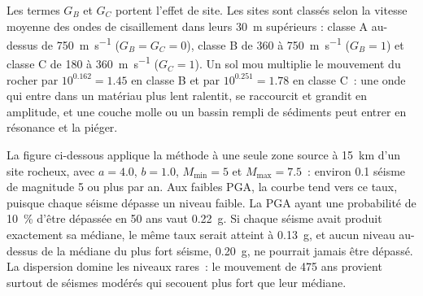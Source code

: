 Les termes $G_B$ et $G_C$ portent l'effet de site. Les sites sont classés selon la vitesse moyenne des ondes de
cisaillement dans leurs \qty{30}{m} supérieurs : classe A au-dessus de \qty{750}{m.s^{-1}} ($G_B = G_C = 0$),
classe B de 360 à \qty{750}{m.s^{-1}} ($G_B = 1$) et classe C de 180 à \qty{360}{m.s^{-1}} ($G_C = 1$).
Un sol mou multiplie le mouvement du rocher par $10^{0.162} = 1.45$ en classe B et par $10^{0.251} = 1.78$
en classe C~: une onde qui entre dans un matériau plus lent ralentit, se raccourcit et grandit en
amplitude, et une couche molle ou un bassin rempli de sédiments peut entrer en résonance et la piéger.

La figure ci-dessous applique la méthode à une seule zone source à \qty{15}{km} d'un site rocheux, avec $a
= 4.0$, $b = 1.0$, $M_{\min} = 5$ et $M_{\max} = 7.5$~: environ 0.1 séisme de magnitude 5 ou
plus par an. Aux faibles PGA, la courbe tend vers ce taux, puisque chaque séisme dépasse un niveau
faible. La PGA ayant une probabilité de \qty{10}{\percent} d'être dépassée en 50 ans vaut \qty{0.22}{g}. Si chaque séisme avait produit
exactement sa médiane, le même taux serait atteint à \qty{0.13}{g}, et aucun niveau au-dessus de la médiane
du plus fort séisme, \qty{0.20}{g}, ne pourrait jamais être dépassé. La dispersion domine les niveaux rares~:
le mouvement de 475 ans provient surtout de séismes modérés qui secouent plus fort que leur
médiane.

